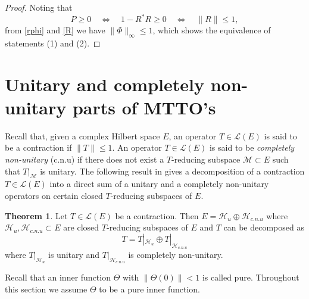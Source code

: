 \documentclass{amsart}
\theoremstyle{definition}
\newtheorem{thm}{Theorem}[section]
\newcommand{\h}{\mathcal{\mathcal H}}
\newcommand{\hsp}{\mathcal{H}}
\newcommand{\oL }{\mathcal{L}(E) }
\begin{document}
\begin{proof}
Noting that 
\begin{equation}\label{R}
P\geq 0 \quad \iff \quad 1-R^*R\geq 0 \quad  \iff\quad \|R\|\leq 1,
\end{equation}
from \eqref{rphi} and \eqref{R} we have $\|\Phi\|_{\infty}\leq 1$, which shows the equivalence of statements (1) and (2). 
\end{proof}

 \section{\bf{Unitary and completely non-unitary parts of MTTO's}}\label{s3}

Recall that, given a complex Hilbert space $E$,  an operator $T\in \oL$ is said to be a contraction if $\|T\|\leq 1$. An operator $T\in \oL$ is said to be \emph{completely non-unitary} (c.n.u) if there does not exist a $T$-reducing subspace $\mathcal{M}\subset E$ such that $T|_{\mathcal{M}}$ is unitary. The following result in \cite{NF} gives a decomposition of a contraction $T\in \oL$ into a direct sum of a unitary and a completely non-unitary operators on certain closed $T$-reducing subspaces of $E$.

\medskip


 \begin{thm}\cite{NF}\label{ucnu}
     Let $T\in \oL$ be a contraction.  Then $E=\h_u\oplus \h_{c.n.u}$ where $\h_u,\h_{c.n.u}\subset E$ are closed $T$-reducing subspaces of $E$ and $T$ can be decomposed as
     $$T=T|_{\hsp_u}\oplus T|_{\hsp_{c.n.u}}$$ where $T|_{\h_u}$ is unitary and $T|_{\h_{c.n.u}}$ is completely non-unitary.
 \end{thm}

\medskip

 
 Recall that an inner function $\Theta$ with $\|\Theta(0)\|<1$ is called pure. Throughout
this section we assume $\Theta$ to be a pure inner function.

\medskip



\end{document}
